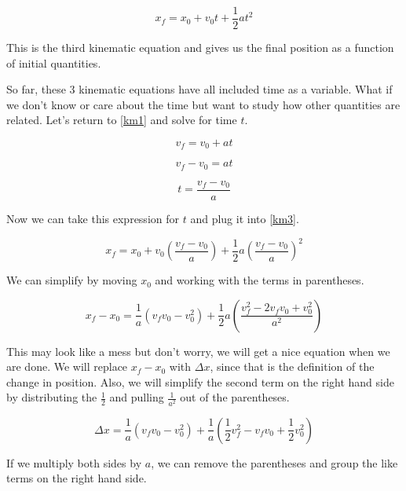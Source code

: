 \documentclass[12pt]{book}
\begin{document}
\begin{equation}
x_f = x_0 + v_0 t + \frac{1}{2} a t^2
\label{km3}
\end{equation}

This is the third kinematic equation and gives us the final position as a function of initial quantities.

So far, these 3 kinematic equations have all included time as a variable. What if we don't know or care about the time but want to study how other quantities are related. Let's return to \ref{km1} and solve for time $t$.

\begin{equation}
v_f = v_0 + at
\end{equation}

\begin{equation}
v_f - v_0 = at
\end{equation}

\begin{equation}
t = \frac{v_f - v_0}{a}
\end{equation}

Now we can take this expression for $t$ and plug it into \ref{km3}.

\begin{equation}
x_f = x_0 + v_0 \left( \frac{v_f - v_0}{a} \right) + \frac{1}{2} a \left( \frac{v_f - v_0}{a} \right)^2
\end{equation}

We can simplify by moving $x_0$ and working with the terms in parentheses.

\begin{equation}
x_f - x_0 = \frac{1}{a} (v_f v_0 - v_0^2) + \frac{1}{2}a \left( \frac{v_f^2 - 2 v_f v_0 + v_0^2}{a^2} \right)
\end{equation}

This may look like a mess but don't worry, we will get a nice equation when we are done. We will replace $x_f - x_0$ with $\Delta x$, since that is the definition of the change in position. Also, we will simplify the second term on the right hand side by distributing the $\frac{1}{2}$ and pulling $\frac{1}{a^2}$ out of the parentheses.

\begin{equation}
\Delta x = \frac{1}{a} (v_f v_0 - v_0^2) + \frac{1}{a} (\frac{1}{2} v_f^2 - v_f v_0 + \frac{1}{2} v_0^2)
\end{equation}

If we multiply both sides by $a$, we can remove the parentheses and group the like terms on the right hand side.
\end{document}
